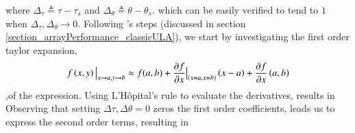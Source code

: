     \else
    \fi
    where $ \Delta_{\tau} \triangleq \tau-\tau_{s} $ and $ \Delta_{\theta} \triangleq \theta-\theta_{s}$.
    which can be easily verified to tend to $ 1 $ when $ \Delta_{\tau},\Delta_{\theta} \rightarrow 0$. 
    Following \cite{VanTrees2002DetectionIV}'s steps (discussed in section \ref{section_arrayPerformance_classicULA}), we start by investigating the first order taylor expansion,$$ \evalat{f\left(x,y\right)}{x\to{}a,y\to{}b} \approx f(a,b) + \evalat{\frac{\partial{f}}{\partial{x}}}{\left(x=a,x=b\right)}\left(x-a\right) + \frac{\partial{f}}{\partial{x}}\left(a,b\right) $$,of the expression.
    Using L'Hôpital's rule to evaluate the derivatives, results in 
    Observing that setting $\Delta{\tau},\Delta{\theta} = 0$ zeros the first order coefficients, leads us to express the second order terms, resulting in 
